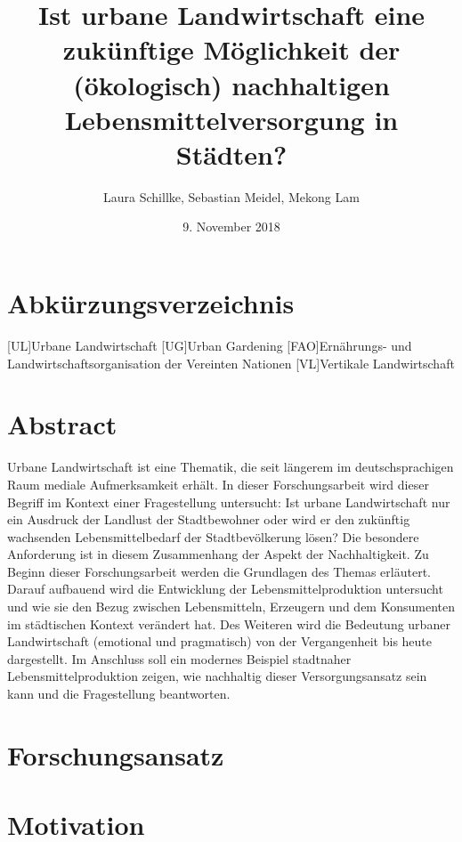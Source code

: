 \documentclass{scrartcl}
\title{Ist urbane Landwirtschaft eine zukünftige Möglichkeit der (ökologisch) nachhaltigen Lebensmittelversorgung in Städten?}
\author{Laura Schillke, Sebastian Meidel, Mekong Lam }
\date{9. November 2018}
\begin{document}
\maketitle


\newpage

\setcounter{tocdepth}{2}
\tableofcontents 



\newpage
\section{Abkürzungsverzeichnis}

\begin{acronym}
	[UL]{Urbane Landwirtschaft}
	[UG]{Urban Gardening}
	[FAO]{Ernährungs- und Landwirtschaftsorganisation der Vereinten Nationen} 
	[VL]{Vertikale Landwirtschaft}
\end{acronym}


\newpage

\section{Abstract}
Urbane Landwirtschaft ist eine Thematik, die seit längerem im deutschsprachigen Raum mediale Aufmerksamkeit erhält. In dieser Forschungsarbeit wird dieser Begriff im Kontext einer Fragestellung untersucht: Ist urbane Landwirtschaft nur ein Ausdruck der Landlust der Stadtbewohner oder wird er den zukünftig wachsenden Lebensmittelbedarf der Stadtbevölkerung lösen? Die besondere Anforderung ist in diesem Zusammenhang der Aspekt der Nachhaltigkeit. Zu Beginn dieser Forschungsarbeit werden die Grundlagen des Themas erläutert. Darauf aufbauend wird die Entwicklung der Lebensmittelproduktion untersucht und wie sie den Bezug zwischen Lebensmitteln, Erzeugern und dem Konsumenten im städtischen Kontext verändert hat. Des Weiteren wird die Bedeutung urbaner Landwirtschaft (emotional und pragmatisch) von der Vergangenheit bis heute dargestellt. Im Anschluss soll ein modernes Beispiel stadtnaher Lebensmittelproduktion zeigen, wie nachhaltig dieser Versorgungsansatz sein kann und die Fragestellung beantworten.

\section{Forschungsansatz}

\section{Motivation}
\end{document}
